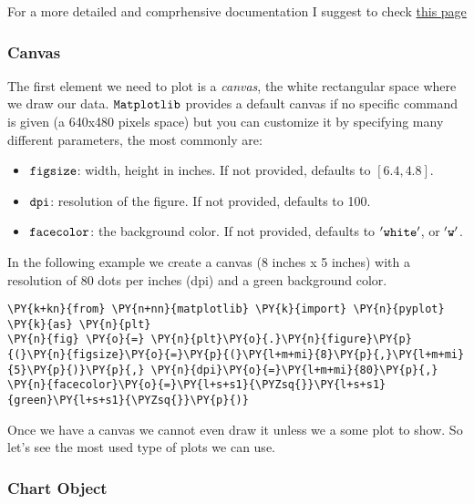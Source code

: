     For a more detailed and comprhensive documentation I suggest to check
\href{https://matplotlib.org}{this page}

\hypertarget{canvas}{%
\subsubsection{Canvas}\label{canvas}}

The first element we need to plot is a \emph{canvas}, the white
rectangular space where we draw our data. \(\tt{Matplotlib}\) provides a
default canvas if no specific command is given (a 640x480 pixels space)
but you can customize it by specifying many different parameters, the
most commonly are:

\begin{itemize}
\tightlist
\item
  \(\tt{figsize}\): width, height in inches. If not provided, defaults
  to \([6.4, 4.8]\).
\item
  \(\tt{dpi}\): resolution of the figure. If not provided, defaults to
  100.
\item
  \(\tt{facecolor}\): the background color. If not provided, defaults to
  \(\tt{'white'}\), or \(\tt{'w'}\).
\end{itemize}

In the following example we create a canvas (8 inches x 5 inches) with a
resolution of 80 dots per inches (dpi) and a green background color.

    \begin{tcolorbox}[breakable, size=fbox, boxrule=1pt, pad at break*=1mm,colback=cellbackground, colframe=cellborder]
\begin{Verbatim}[commandchars=\\\{\}]
\PY{k+kn}{from} \PY{n+nn}{matplotlib} \PY{k}{import} \PY{n}{pyplot} \PY{k}{as} \PY{n}{plt}
\PY{n}{fig} \PY{o}{=} \PY{n}{plt}\PY{o}{.}\PY{n}{figure}\PY{p}{(}\PY{n}{figsize}\PY{o}{=}\PY{p}{(}\PY{l+m+mi}{8}\PY{p}{,}\PY{l+m+mi}{5}\PY{p}{)}\PY{p}{,} \PY{n}{dpi}\PY{o}{=}\PY{l+m+mi}{80}\PY{p}{,} \PY{n}{facecolor}\PY{o}{=}\PY{l+s+s1}{\PYZsq{}}\PY{l+s+s1}{green}\PY{l+s+s1}{\PYZsq{}}\PY{p}{)}
\end{Verbatim}
\end{tcolorbox}

    Once we have a canvas we cannot even draw it unless we a some plot to
show. So let's see the most used type of plots we can use.

\hypertarget{chart-object}{%
\subsubsection{Chart Object}\label{chart-object}}

